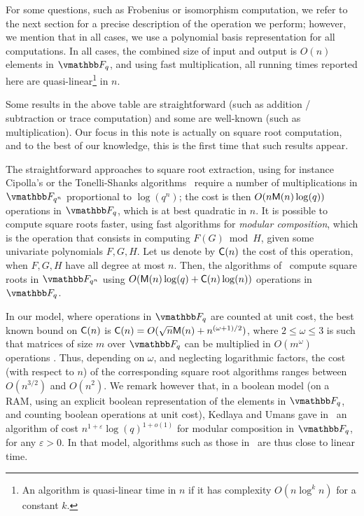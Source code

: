 For some questions, such as Frobenius or isomorphism computation, we
refer to the next section for a precise description of the operation
we perform; however, we mention that in all cases, we use a polynomial
basis representation for all computations. In all cases, the combined
size of input and output is $O(n)$ elements in $\F_q$, and using fast
multiplication, all running times reported here are quasi-linear\footnote{
An algorithm is quasi-linear time in $n$ if it has complexity $O(n\log^kn)$
for a constant $k$.} in $n$.

Some results in the above table are straightforward (such as addition
/ subtraction or trace computation) and some are well-known (such as
multiplication). Our focus in this note is actually on square root
computation, and to the best of our knowledge, this is the first time
that such results appear. 

The straightforward approaches to square root extraction, using for
instance Cipolla's or the Tonelli-Shanks
algorithms~\cite{Tonelli1891, Cipolla1903, Shanks1972} require a number
of multiplications in $\F_{q^n}$ proportional to $\log(q^n)$; the
cost is then $O(n \mathsf{M}(n)\log(q))$ operations in $\F_q$, which is
at best quadratic in $n$. It is possible to compute square roots faster,
using fast algorithms for {\em modular composition}, which is the
operation that consists in computing $F(G) \bmod H$,  given some
univariate polynomials $F,G,H$. Let us denote by $\mathsf{C}(n)$ the cost of
this operation, when $F,G,H$ have all degree at most $n$. Then, the
algorithms of~\cite{KaltofenShoup1997,DlsSch2011} compute square roots
in $\F_{q^n}$ using $O(\mathsf{M}(n)\log(q) + \mathsf{C}(n)\log(n))$ operations in
$\F_q$.

In our model, where operations in $\F_q$ are counted at unit cost, the
best known bound on $\mathsf{C}(n)$ is $\mathsf{C}(n)=O(\sqrt{n}\mathsf{M}(n) +
n^{(\omega+1)/2})$, where $2 \le \omega \le 3$ is such that matrices
of size $m$ over $\F_q$ can be multiplied in $O(m^\omega)$ operations \cite{BrKu78}.
Thus, depending on $\omega$, and neglecting logarithmic factors, the
cost (with respect to $n$) of the corresponding square root algorithms
ranges between $O(n^{3/2})$ and $O(n^{2})$. We remark however that, in
a boolean model (on a RAM, using an explicit boolean representation of the
elements in $\F_q$, and counting boolean operations at unit cost),
Kedlaya and Umans gave in~\cite{KeUm11} an algorithm of cost
$n^{1+\varepsilon} \log(q)^{1+o(1)}$ for modular composition in
$\F_q$, for any $\varepsilon > 0$. In that model, algorithms such as
those in~\cite{KaltofenShoup1997,DlsSch2011} are thus close to linear time.

